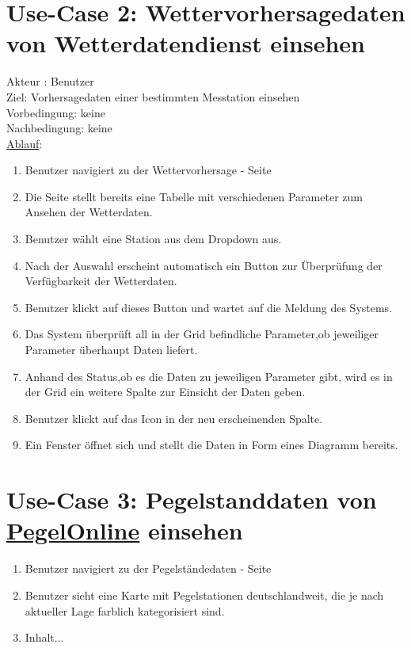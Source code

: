 \documentclass[a4paper,12pt]{scrreprt}
\begin{document}
\section*{\small \textbf{Use-Case 2: Wettervorhersagedaten von Wetterdatendienst einsehen}}
Akteur : Benutzer\\
Ziel:  Vorhersagedaten einer bestimmten Messtation einsehen\\
Vorbedingung: keine\\
Nachbedingung: keine\\
\underline{Ablauf}:
\begin{enumerate}
\item Benutzer navigiert zu der Wettervorhersage - Seite
\item Die Seite stellt bereits eine Tabelle mit verschiedenen Parameter zum Ansehen der Wetterdaten.
\item Benutzer wählt eine Station aus dem Dropdown aus.
\item Nach der Auswahl erscheint automatisch ein Button zur Überprüfung der Verfügbarkeit der Wetterdaten.
\item Benutzer klickt auf dieses Button und wartet auf die Meldung des Systems.
\item Das System überprüft all in der Grid befindliche Parameter,ob jeweiliger Parameter überhaupt Daten liefert. 
\item Anhand des Status,ob es die Daten zu jeweiligen Parameter gibt, wird es in der Grid ein weitere Spalte zur Einsicht der Daten geben. 
\item Benutzer klickt auf das Icon in der neu erscheinenden Spalte.
\item Ein Fenster öffnet sich und stellt die Daten in Form eines Diagramm bereits. 
\end{enumerate}
\section*{\small \textbf{Use-Case 3: Pegelstanddaten von \href{https://www.pegelonline.wsv.de/gast/start} {PegelOnline} einsehen}}
\begin{enumerate}
\item Benutzer navigiert zu der Pegelständedaten - Seite
\item Benutzer sieht eine Karte mit Pegelstationen deutschlandweit, die je nach aktueller Lage farblich kategorisiert sind.
\item 
	Inhalt...
\end{enumerate}
\end{document}
